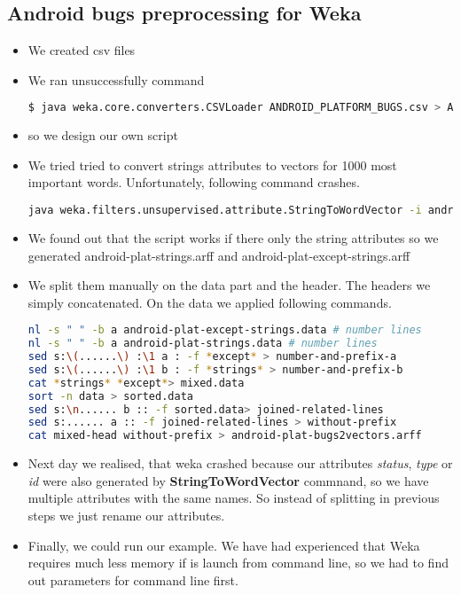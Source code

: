 \subsection{Android bugs preprocessing for Weka} %
\label{sub:Android bugs preprocessing for Weka}
\begin{itemize}
    \item We created csv files
    \item We ran unsuccessfully command
\begin{lstlisting}[language=sh]
$ java weka.core.converters.CSVLoader ANDROID_PLATFORM_BUGS.csv > ANDROID_PLATFORM_BUGS.arff
\end{lstlisting}
    \item so we design our own script
    \item  We tried tried to convert strings attributes to vectors for 1000 most important words. Unfortunately, following command crashes.
\begin{lstlisting}[language=sh]
    java weka.filters.unsupervised.attribute.StringToWordVector -i android-platform-bugs.arff -o android_plat-bugs-Vectors.arff
\end{lstlisting}
    \item We found out that the script works if there only the string attributes so we generated
    android-plat-strings.arff and android-plat-except-strings.arff
    \item We split them manually on the data part and the header.
    The headers we simply concatenated. On the data we applied following commands.
\begin{lstlisting}[language=sh]
nl -s " " -b a android-plat-except-strings.data # number lines
nl -s " " -b a android-plat-strings.data # number lines
sed s:\(......\) :\1 a : -f *except* > number-and-prefix-a
sed s:\(......\) :\1 b : -f *strings* > number-and-prefix-b
cat *strings* *except*> mixed.data
sort -n data > sorted.data
sed s:\n...... b :: -f sorted.data> joined-related-lines
sed s:...... a :: -f joined-related-lines > without-prefix
cat mixed-head without-prefix > android-plat-bugs2vectors.arff
\end{lstlisting}
    \item Next day we realised, that weka crashed because our attributes {\it status}, {\it type} or {\it id} were also generated by {\bf StringToWordVector} commnand, so we have multiple attributes with the same names. So instead of splitting in previous steps we just rename our attributes.
    \item Finally, we could run our example. We have had experienced that Weka requires much less memory if is launch from command line, so we had to find out parameters for command line first.

\end{itemize}
